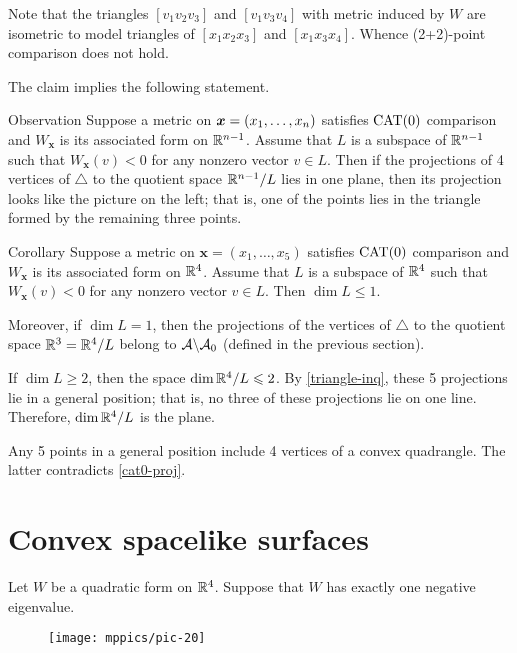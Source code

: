 \documentclass{article}
\begin{document}
Note that the triangles $[v_1v_2v_3]$ and $[v_1v_3v_4]$ with metric induced by $W$ are isometric to model triangles of $[x_1x_2x_3]$ and $[x_1x_3x_4]$.
Whence (2+2)-point comparison does not hold.
\qeds


The claim implies the following statement.


\begin{thm}{Observation}\label{cat0-proj}
Suppose a metric on $\bm{x}\z=(x_1,\dots,x_n)$ satisfies $\mathrm{CAT}(0)$ comparison
and $W_{\bm{x}}$ is its associated form on $\mathbb{R}^{n-1}$.
Assume that $L$ is a subspace of $\mathbb{R}^{n-1}$ such that
$W_{\bm{x}}(v)< 0$ for any nonzero vector $v\in L$.
Then if the projections of 4 vertices of $\triangle$ to the quotient space $\mathbb{R}^{n-1}/L$ lies in one plane, then its projection looks like the picture on the left;
that is, one of the points lies in the triangle formed by the remaining three points.
\end{thm}

\begin{thm}{Corollary}\label{cor:3+2}
Suppose a metric on $\bm{x}=(x_1,\dots,x_5)$ satisfies $\mathrm{CAT}(0)$ comparison
and $W_{\bm{x}}$ is its associated form on $\mathbb{R}^{4}$.
Assume that $L$ is a subspace of $\mathbb{R}^{4}$ such that
$W_{\bm{x}}(v)< 0$ for any nonzero vector $v\in L$.
Then $\dim L\le 1$.

Moreover, if $\dim L= 1$, then the projections of the vertices of $\triangle$ to the quotient space $\mathbb{R}^3=\mathbb{R}^4/L$ belong to $\mathcal{A}\backslash\mathcal{A}_0$ (defined in the previous section). 
\end{thm}

If $\dim L\ge 2$, then the space $\mathop{\rm dim}\nolimits \mathbb{R}^4/L\leqslant 2$.
By \ref{triangle-inq}, these 5 projections lie in a general position; that is, no three of these projections lie on one line. 
Therefore, $\mathop{\rm dim}\nolimits \mathbb{R}^4/L$ is the plane.

Any 5 points in a general position include 4 vertices of a convex quadrangle.
The latter contradicts \ref{cat0-proj}.
\qeds

\section{Convex spacelike surfaces}

Let $W$ be a quadratic form on $\mathbb{R}^4$.
Suppose that  $W$ has exactly one negative eigenvalue.

\begin{wrapfigure}{r}{55mm}
\vskip-0mm
\centering
\texttt{[image: mppics/pic-20]}
\end{wrapfigure}
\end{document}
